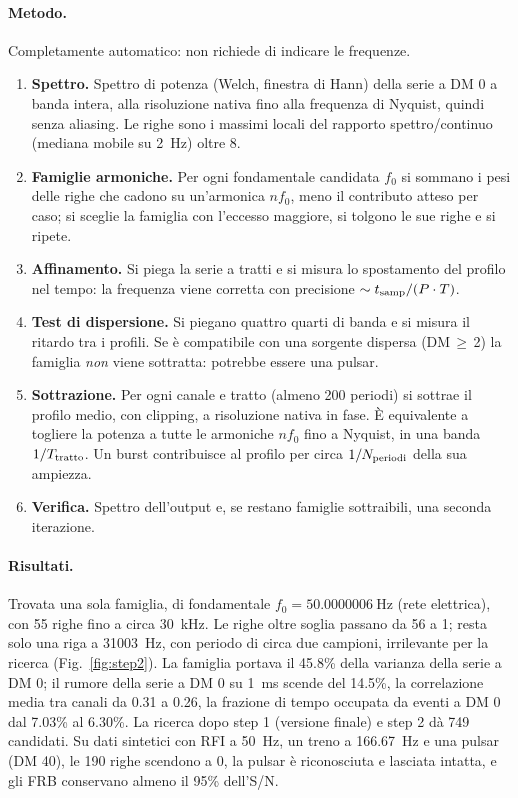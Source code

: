 \paragraph{Metodo.} Completamente automatico: non richiede di indicare le frequenze.
\begin{enumerate}
  \item \textbf{Spettro.} Spettro di potenza (Welch, finestra di Hann) della serie a DM 0 a banda intera, alla
    risoluzione nativa fino alla frequenza di Nyquist, quindi senza aliasing. Le righe sono i massimi locali del
    rapporto spettro/continuo (mediana mobile su \SI{2}{\hertz}) oltre 8.
  \item \textbf{Famiglie armoniche.} Per ogni fondamentale candidata $f_0$ si sommano i pesi delle righe che cadono su
    un'armonica $n f_0$, meno il contributo atteso per caso; si sceglie la famiglia con l'eccesso maggiore, si tolgono
    le sue righe e si ripete.
  \item \textbf{Affinamento.} Si piega la serie a tratti e si misura lo spostamento del profilo nel tempo: la
    frequenza viene corretta con precisione $\sim t_{\rm samp}/(P\cdot T)$.
  \item \textbf{Test di dispersione.} Si piegano quattro quarti di banda e si misura il ritardo tra i profili. Se è
    compatibile con una sorgente dispersa (DM\,$\geq$\,2) la famiglia \emph{non} viene sottratta: potrebbe essere una
    pulsar.
  \item \textbf{Sottrazione.} Per ogni canale e tratto (almeno 200 periodi) si sottrae il profilo medio, con clipping, a
    risoluzione nativa in fase. È equivalente a togliere la potenza a tutte le armoniche $n f_0$ fino a Nyquist, in una
    banda $1/T_{\rm tratto}$. Un burst contribuisce al profilo per circa $1/N_{\rm periodi}$ della sua ampiezza.
  \item \textbf{Verifica.} Spettro dell'output e, se restano famiglie sottraibili, una seconda iterazione.
\end{enumerate}

\paragraph{Risultati.} Trovata una sola famiglia, di fondamentale $f_0=\SI{50.0000006}{\hertz}$ (rete elettrica), con
55 righe fino a circa \SI{30}{\kilo\hertz}. Le righe oltre soglia passano da 56 a 1; resta solo una riga a
\SI{31003}{\hertz}, con periodo di circa due campioni, irrilevante per la ricerca (Fig.~\ref{fig:step2}).
La famiglia portava il 45.8\% della varianza della serie a DM 0; il rumore della serie a DM 0 su \SI{1}{\milli\second}
scende del 14.5\%, la correlazione media tra canali da 0.31 a 0.26, la frazione di tempo occupata da eventi a DM 0
dal 7.03\% al 6.30\%. La ricerca dopo step 1 (versione finale) e step 2 dà 749 candidati.
Su dati sintetici con RFI a \SI{50}{\hertz}, un treno a \SI{166.67}{\hertz} e una pulsar (DM 40), le 190 righe
scendono a 0, la pulsar è riconosciuta e lasciata intatta, e gli FRB conservano almeno il 95\% dell'S/N.

